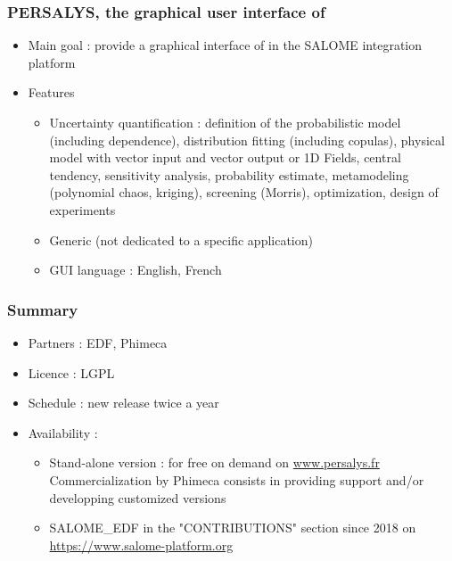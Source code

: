 \documentclass[aspectratio=169]{beamer}
\begin{document}

\begin{frame}
  \frametitle{PERSALYS, the graphical user interface of \ot{}}

  \begin{itemize}
  \item Main goal : provide a graphical interface of
    \ot{} in the SALOME integration platform
  \item Features
    \begin{itemize}
    \item Uncertainty quantification : definition of the
      probabilistic model (including dependence), distribution fitting (including
      copulas), physical model with vector input
      and vector output or 1D Fields,
      central tendency, sensitivity analysis, probability estimate,
      metamodeling (polynomial chaos, kriging), screening (Morris),
      optimization, design of experiments
    \item Generic (not dedicated to a specific application)
    \item GUI language : English, French
    \end{itemize}
  \end{itemize}

\end{frame}


\begin{frame}
  \frametitle{Summary}
  \begin{itemize}
  \item Partners : EDF, Phimeca
  \item Licence : LGPL
  \item Schedule : new release twice a year
  \item Availability :
    \begin{itemize}
    \item Stand-alone version : for free on demand on \url{www.persalys.fr}\\
      Commercialization by Phimeca consists in providing support and/or developping customized versions
    \item SALOME\_EDF in the "CONTRIBUTIONS" section
      since 2018 on \url{https://www.salome-platform.org}
    \end{itemize}
  \end{itemize}
\end{frame}
\end{document}
